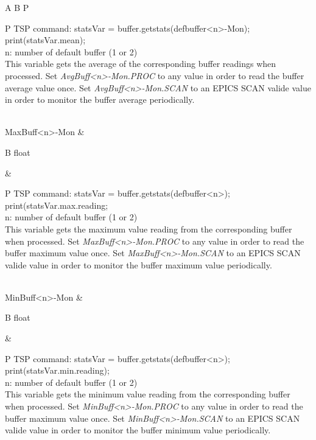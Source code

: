 \documentclass[openany]{article}
\begin{document}
\begin{longtable}{A B P}
\begin{tabular}{P}
					TSP command: statsVar = buffer.getstats(defbuffer\textless n\textgreater-Mon); print(statsVar.mean); \\
					n: number of default buffer (1 or 2) \\
					This variable gets the average of the corresponding buffer readings when processed. Set \emph{AvgBuff\textless n\textgreater-Mon.PROC} to any value in order to read the buffer average value once. Set \emph{AvgBuff\textless n\textgreater-Mon.SCAN} to an EPICS SCAN valide value in order to monitor the buffer average periodically.
				\end{tabular} \\ \hline
		MaxBuff\textless n\textgreater-Mon & \begin{tabular}{B}
					float
				\end{tabular} & 
				\begin{tabular}{P}
					TSP command: statsVar = buffer.getstats(defbuffer\textless n\textgreater); print(statsVar.max.reading; \\
					n: number of default buffer (1 or 2) \\
					This variable gets the maximum value reading from the corresponding buffer when processed. Set \emph{MaxBuff\textless n\textgreater-Mon.PROC} to any value in order to read the buffer maximum value once. Set \emph{MaxBuff\textless n\textgreater-Mon.SCAN} to an EPICS SCAN valide value in order to monitor the buffer maximum value periodically.
				\end{tabular} \\ \hline
		MinBuff\textless n\textgreater-Mon & \begin{tabular}{B}
					float
				\end{tabular} & 
				\begin{tabular}{P}
					TSP command: statsVar = buffer.getstats(defbuffer\textless n\textgreater); print(statsVar.min.reading); \\
					n: number of default buffer (1 or 2) \\
					This variable gets the minimum value reading from the corresponding buffer when processed. Set \emph{MinBuff\textless n\textgreater-Mon.PROC} to any value in order to read the buffer maximum value once. Set \emph{MinBuff\textless n\textgreater-Mon.SCAN} to an EPICS SCAN valide value in order to monitor the buffer minimum value periodically.
				\end{tabular} \\


\end{longtable}
\end{document}
